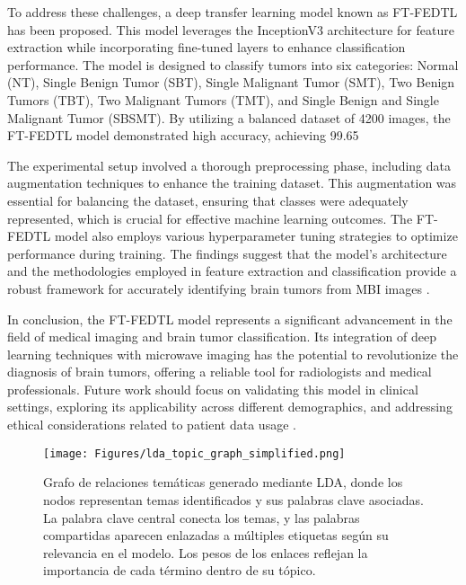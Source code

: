 \documentclass[runningheads]{llncs}
\begin{document}
To address these challenges, a deep transfer learning model known as FT-FEDTL has been proposed. This model leverages the InceptionV3 architecture for feature extraction while incorporating fine-tuned layers to enhance classification performance. The model is designed to classify tumors into six categories: Normal (NT), Single Benign Tumor (SBT), Single Malignant Tumor (SMT), Two Benign Tumors (TBT), Two Malignant Tumors (TMT), and Single Benign and Single Malignant Tumor (SBSMT). By utilizing a balanced dataset of 4200 images, the FT-FEDTL model demonstrated high accuracy, achieving 99.65%

The experimental setup involved a thorough preprocessing phase, including data augmentation techniques to enhance the training dataset. This augmentation was essential for balancing the dataset, ensuring that classes were adequately represented, which is crucial for effective machine learning outcomes. The FT-FEDTL model also employs various hyperparameter tuning strategies to optimize performance during training. The findings suggest that the model's architecture and the methodologies employed in feature extraction and classification provide a robust framework for accurately identifying brain tumors from MBI images \cite{Hossain_2024}.

In conclusion, the FT-FEDTL model represents a significant advancement in the field of medical imaging and brain tumor classification. Its integration of deep learning techniques with microwave imaging has the potential to revolutionize the diagnosis of brain tumors, offering a reliable tool for radiologists and medical professionals. Future work should focus on validating this model in clinical settings, exploring its applicability across different demographics, and addressing ethical considerations related to patient data usage \cite{Hossain_2024}.
\begin{figure}[h]
\centering
\texttt{[image: Figures/lda\_topic\_graph\_simplified.png]}
\caption{Grafo de relaciones temáticas generado mediante LDA, donde los nodos representan temas identificados y sus palabras clave asociadas. La palabra clave central conecta los temas, y las palabras compartidas aparecen enlazadas a múltiples etiquetas según su relevancia en el modelo. Los pesos de los enlaces reflejan la importancia de cada término dentro de su tópico.}
\end{figure}
\end{document}
